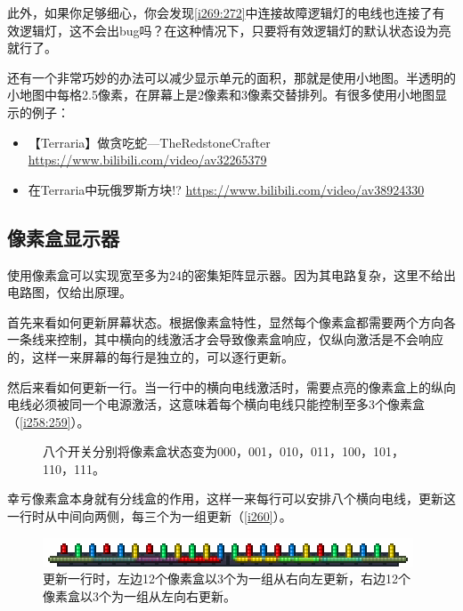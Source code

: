 此外，如果你足够细心，你会发现\autoref{i269:272}中连接故障逻辑灯的电线也连接了有效逻辑灯，这不会出bug吗？在这种情况下，只要将有效逻辑灯的默认状态设为亮就行了。

还有一个非常巧妙的办法可以减少显示单元的面积，那就是使用小地图。半透明的小地图中每格2.5像素，在屏幕上是2像素和3像素交替排列。有很多使用小地图显示的例子：
\begin{itemize}
\item 【Terraria】做贪吃蛇—TheRedstoneCrafter \url{https://www.bilibili.com/video/av32265379}
\item 在Terraria中玩俄罗斯方块!? \url{https://www.bilibili.com/video/av38924330}
\end{itemize}

\subsection{像素盒显示器}

使用像素盒可以实现宽至多为24的密集矩阵显示器。因为其电路复杂，这里不给出电路图，仅给出原理。

首先来看如何更新屏幕状态。根据像素盒特性，显然每个像素盒都需要两个方向各一条线来控制，其中横向的线激活才会导致像素盒响应，仅纵向激活是不会响应的，这样一来屏幕的每行是独立的，可以逐行更新。

然后来看如何更新一行。当一行中的横向电线激活时，需要点亮的像素盒上的纵向电线必须被同一个电源激活，这意味着每个横向电线只能控制至多3个像素盒（\autoref{i258:259}）。

\begin{figure}[!h]
\begin{center}
\qquad
{}
\end{center}
\caption{八个开关分别将像素盒状态变为000，001，010，011，100，101，110，111。}
\label{i258:259}
\end{figure}

幸亏像素盒本身就有分线盒的作用，这样一来每行可以安排八个横向电线，更新这一行时从中间向两侧，每三个为一组更新（\autoref{i260}）。

\begin{figure}[!h]
\centering
\includegraphics{images/260.png}
\caption{更新一行时，左边12个像素盒以3个为一组从右向左更新，右边12个像素盒以3个为一组从左向右更新。}
\label{i260}
\end{figure}

